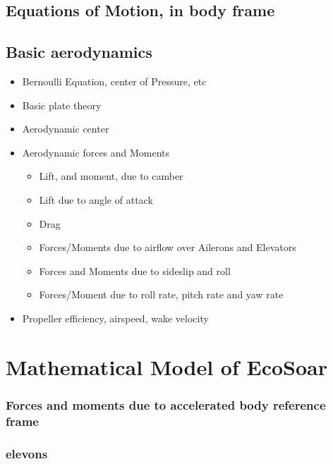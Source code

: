 \documentclass{article}
\begin{document}
\subsection{Equations of Motion, in body frame}


\subsection {Basic aerodynamics}

\begin{itemize}
        \item Bernoulli Equation, center of Pressure, etc
        \item Basic plate theory
        \item Aerodynamic center    
        \item Aerodynamic forces and Moments
        \begin{itemize}
            \item Lift, and moment, due to camber
            \item Lift due to angle of attack
            \item Drag
            \item Forces/Moments due to airflow over Ailerons and Elevators
            \item Forces and Moments due to sideslip and roll
            \item Forces/Moment due to roll rate, pitch rate and yaw rate
        \end{itemize}
        \item Propeller efficiency, airspeed, wake velocity
    \end{itemize}

\section{Mathematical Model of EcoSoar}








\subsubsection{Forces and moments due to accelerated body reference frame}



\subsubsection{elevons}

\end{document}
